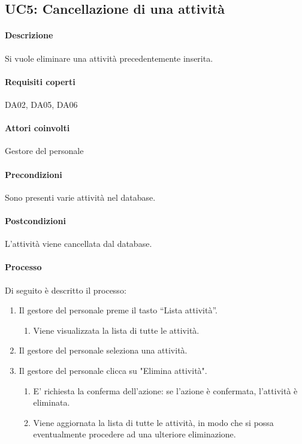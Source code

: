 \subsection{UC5: Cancellazione di una attività}
\paragraph{Descrizione}
Si vuole eliminare una attività precedentemente inserita.
\paragraph{Requisiti coperti}
DA02, DA05, DA06
\paragraph{Attori coinvolti}
Gestore del personale
\paragraph{Precondizioni}
Sono presenti varie attività nel database.
\paragraph{Postcondizioni}
L'attività viene cancellata dal database.
\paragraph{Processo}
Di seguito è descritto il processo:
\begin{enumerate}
	\item Il gestore del personale preme il tasto “Lista attività”.
		\begin{enumerate}
			\item Viene visualizzata la lista di tutte le attività.
		\end{enumerate}
	\item Il gestore del personale seleziona una attività. 
	\item Il gestore del personale clicca su "Elimina attività".
		\begin{enumerate}
			\item E' richiesta la conferma dell’azione: se l’azione è confermata, l'attività è eliminata.
			\item Viene aggiornata la lista di tutte le attività, in modo che si possa eventualmente procedere ad una ulteriore eliminazione.
		\end{enumerate}
\end{enumerate}
